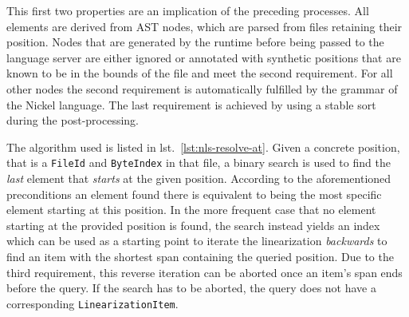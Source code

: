 \documentclass[
  a4paper,
  bibtex,
  english,
  nomenclature]{kthlatex/kththesis/kththesis}
\begin{document}
This first two properties are an implication of the preceding processes.
All elements are derived from AST nodes, which are parsed from files
retaining their position. Nodes that are generated by the runtime before
being passed to the language server are either ignored or annotated with
synthetic positions that are known to be in the bounds of the file and
meet the second requirement. For all other nodes the second requirement
is automatically fulfilled by the grammar of the Nickel language. The
last requirement is achieved by using a stable sort during the
post-processing.

The algorithm used is listed in lst.~\ref{lst:nls-resolve-at}. Given a
concrete position, that is a \texttt{FileId} and \texttt{ByteIndex} in
that file, a binary search is used to find the \emph{last} element that
\emph{starts} at the given position. According to the aforementioned
preconditions an element found there is equivalent to being the most
specific element starting at this position. In the more frequent case
that no element starting at the provided position is found, the search
instead yields an index which can be used as a starting point to iterate
the linearization \emph{backwards} to find an item with the shortest
span containing the queried position. Due to the third requirement, this
reverse iteration can be aborted once an item's span ends before the
query. If the search has to be aborted, the query does not have a
corresponding \texttt{LinearizationItem}.
\end{document}
